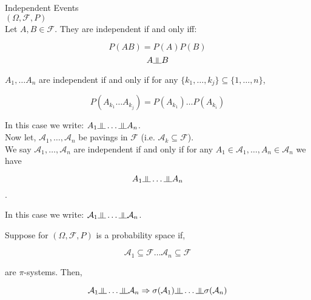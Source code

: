 \documentclass[11pt,fleqn]{book} %
\newcommand{\indep}{\rotatebox[origin=c]{90}{$\models$}}
\begin{document}
Independent Events\\

$(\Omega, \mathcal{F}, P)$\\

Let $A, B \in \mathcal{F}$. They are independent if and only iff: 

$$P(AB) = P(A)P(B) $$
$$A \indep B  $$

$A_1, \dots A_n$ are independent if and only if for any $\{k_1, \dots, k_j \} \subseteq \{1, \dots, n\}$, 

$$P(A_{k_1} \dots A_{k_j}) = P(A_{k_1}) \dots P(A_{k_i}) $$

In this case we write: $A_1 \indep \dots \indep A_n$.\\


Now let, $\mathcal{A}_1, \dots, \mathcal{A}_n$ be pavings in $\mathcal{F}$ (i.e. $\mathcal{A}_k \subseteq \mathcal{F}$). \\

We say $\mathcal{A}_1, \dots, \mathcal{A}_n$ are independent if and only if for any $A_1 \in \mathcal{A}_1, \dots, A_n \in \mathcal{A}_n$ we have 

$$A_1 \indep \dots \indep A_n $$. 

In this case we write: $\mathcal{A}_1 \indep \dots \indep \mathcal{A}_n$.

\begin{theorem}
	Suppose for $(\Omega, \mathcal{F}, P)$ is a probability space if, 

	$$\mathcal{A}_1 \subseteq \mathcal{F} \dots \mathcal{A}_n \subseteq \mathcal{F}$$

	are $\pi$-systems. Then,

	$$\mathcal{A}_1 \indep \dots \indep \mathcal{A}_n  \Rightarrow \sigma(\mathcal{A}_1) \indep \dots \indep \sigma(\mathcal{A}_n)$$
\end{theorem}
\end{document}
